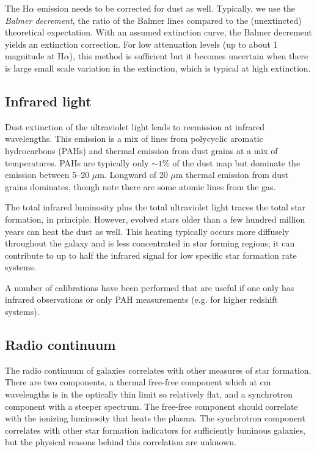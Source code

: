 The H$\alpha$ emission needs to be corrected for dust as well.
Typically, we use the {\it Balmer decrement}, the ratio of the Balmer
lines compared to the (unextincted) theoretical expectation. With an
assumed extinction curve, the Balmer decrement yields an extinction
correction. For low attenuation levels (up to about 1 magnitude at
H$\alpha$), this method is sufficient but it becomes uncertain when
there is large small scale variation in the extinction, which is
typical at high extinction.

\subsection{Infrared light}

Dust extinction of the ultraviolet light leads to reemission at
infrared wavelengths. This emission is a mix of lines from polycyclic
aromatic hydrocarbons (PAHs) and thermal emission from dust grains at
a mix of temperatures. PAHs are typically only $\sim 1$\% of the dust
map but dominate the emission between 5--20 $\mu$m. Longward of 20
$\mu$m thermal emission from dust grains dominates, though note there
are some atomic lines from the gas.

The total infrared luminosity plus the total ultraviolet light traces
the total star formation, in principle. However, evolved stars older
than a few hundred million years can heat the dust as well. This
heating typically occurs more diffusely throughout the galaxy and is
less concentrated in star forming regions; it can contribute to up to
half the infrared signal for low specific star formation rate
systems.

A number of calibrations have been performed that are useful if one
only has infrared observations or only PAH measurements (e.g. for
higher redshift systems).

\subsection{Radio continuum}

The radio continuum of galaxies correlates with other measures of star
formation. There are two components, a thermal free-free component
which at cm wavelengths is in the optically thin limit so relatively
flat, and a synchrotron component with a steeper spectrum. The
free-free component should correlate with the ionizing luminosity that
heats the plasma. The synchrotron component correlates with other star
formation indicators for sufficiently luminous galaxies, but the
physical reasons behind this correlation are unknown.

